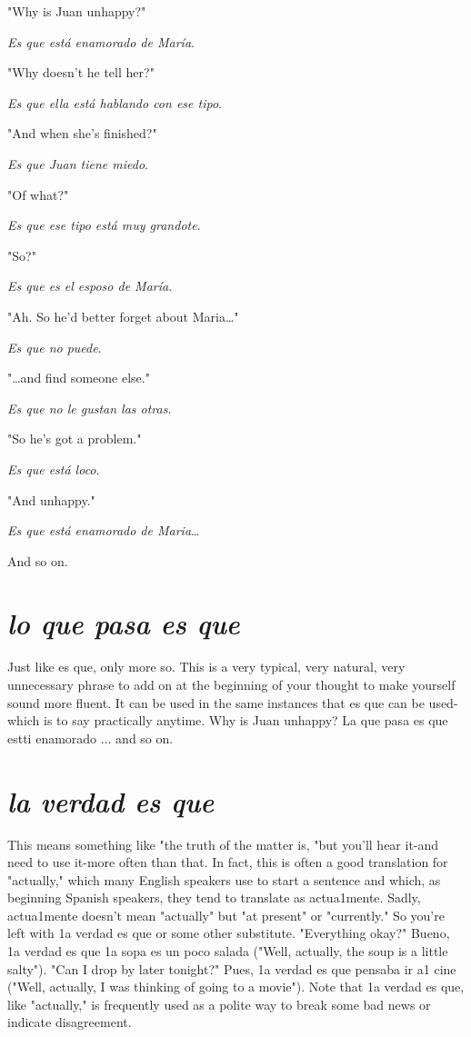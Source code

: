 \bsk

\inda "Why is Juan unhappy?"

\indu \emph{Es que está enamorado de María}.

\inda "Why doesn't he tell her?"

\indu \emph{Es que ella está hablando con ese tipo}.

\inda "And when she's finished?"

\indu \emph{Es que Juan tiene miedo}.

\inda "Of what?"

\indu \emph{Es que ese tipo está muy grandote}.

\inda "So?"

\indu \emph{Es que es el esposo de María}.

\inda "Ah. So he'd better forget about Maria\ldots{}"

\indu \emph{Es que no puede}.

\inda "\ldots{}and find someone else."

\indu \emph{Es que no le gustan las otras}.

\inda "So he's got a problem."

\indu \emph{Es que está loco}.

\inda "And unhappy."

\indu \emph{Es que está enamorado de Maria}\ldots{}

\bsk

And so on.

\section{\emph{lo que pasa es que}}

Just like es que, only more so. This is a very typical, very
natural, very unnecessary phrase to add on at the beginning of your
thought to make yourself sound more fluent. It can be used in the
same instances that es que can be used-which is to say practically
anytime. Why is Juan unhappy? La que pasa es que estti
enamorado ... and so on.

\section{\emph{la verdad es que}}

This means something like "the truth of the matter is, "but
you'll hear it-and need to use it-more often than that. In fact, this is
often a good translation for "actually," which many English speakers
use to start a sentence and which, as beginning Spanish speakers, they
tend to translate as actua1mente. Sadly, actua1mente doesn't mean
"actually" but "at present" or "currently." So you're left with 1a verdad es que or some other substitute. "Everything okay?" Bueno, 1a
verdad es que 1a sopa es un poco salada ("Well, actually, the soup is a
little salty"). "Can I drop by later tonight?" Pues, 1a verdad es que pensaba ir a1 cine ("Well, actually, I was thinking of going to a movie").
Note that 1a verdad es que, like "actually," is frequently used as a polite way to break some bad news or indicate disagreement.

